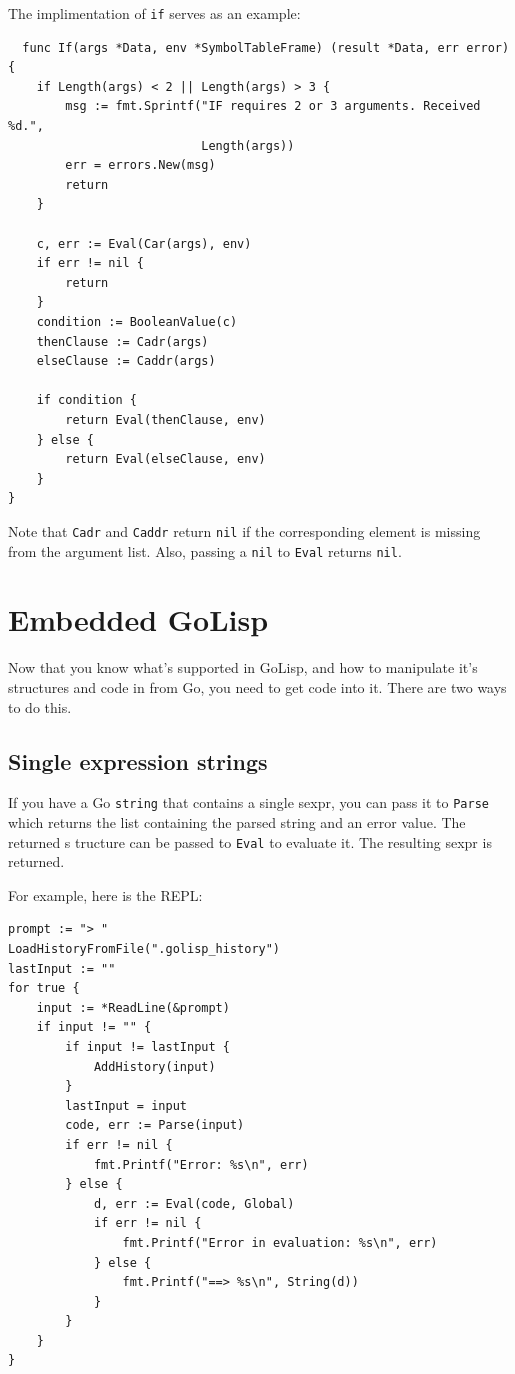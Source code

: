 \documentclass[12pt]{article}
\begin{document}
The implimentation of \verb|if| serves as an example:

\begin{verbatim}
  func If(args *Data, env *SymbolTableFrame) (result *Data, err error) {
    if Length(args) < 2 || Length(args) > 3 {
        msg := fmt.Sprintf("IF requires 2 or 3 arguments. Received %d.",
                           Length(args))
        err = errors.New(msg)
        return
    }

    c, err := Eval(Car(args), env)
    if err != nil {
        return
    }
    condition := BooleanValue(c)
    thenClause := Cadr(args)
    elseClause := Caddr(args)

    if condition {
        return Eval(thenClause, env)
    } else {
        return Eval(elseClause, env)
    }
}
\end{verbatim}

Note that \verb|Cadr| and \verb|Caddr| return \verb|nil| if the
corresponding element is missing from the argument list. Also, passing
a \verb|nil| to \verb|Eval| returns \verb|nil|.

\section{Embedded GoLisp}

Now that you know what's supported in GoLisp, and how to manipulate
it's structures and code in from Go, you need to get code into
it. There are two ways to do this.

\subsection{Single expression strings}

If you have a Go \verb|string| that contains a single sexpr, you can
pass it to \verb|Parse| which returns the list containing the parsed
string and an error value. The returned s tructure can be passed to
\verb|Eval| to evaluate it. The resulting sexpr is returned.

For example, here is the REPL:

\begin{verbatim}
prompt := "> "
LoadHistoryFromFile(".golisp_history")
lastInput := ""
for true {
    input := *ReadLine(&prompt)
    if input != "" {
        if input != lastInput {
            AddHistory(input)
        }
        lastInput = input
        code, err := Parse(input)
        if err != nil {
            fmt.Printf("Error: %s\n", err)
        } else {
            d, err := Eval(code, Global)
            if err != nil {
                fmt.Printf("Error in evaluation: %s\n", err)
            } else {
                fmt.Printf("==> %s\n", String(d))
            }
        }
    }
}
\end{verbatim}
\end{document}
